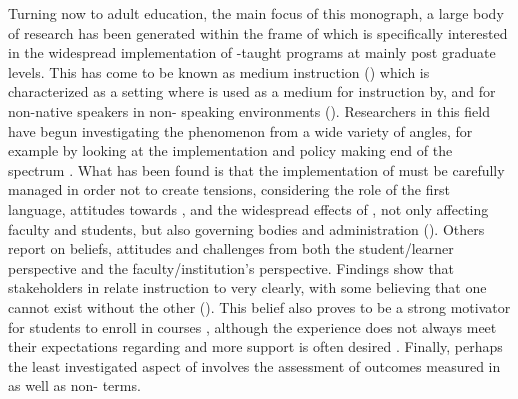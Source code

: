 \documentclass[output=paper]{langsci/langscibook}
\begin{document}
Turning now to adult education, the main focus of this monograph, a large body of research has been generated within the frame of  which is specifically interested in the widespread implementation of -taught programs at mainly post graduate levels. This has come to be known as  medium instruction () which is characterized as a setting where  is used as a medium for instruction by, and for non-native  speakers in non- speaking environments (\citealt{HellekjaerHellekjaer2015}). Researchers in this field have begun investigating the phenomenon from a wide variety of angles, for example by looking at the implementation and policy making end of the spectrum \citep{Tudor2007}. What has been found is that the implementation of  must be carefully managed in order not to create tensions, considering the role of the first language, attitudes towards , and the widespread effects of , not only affecting faculty and students, but also governing bodies and administration (\citealt{DoizEtAl2014policy}). Others report on beliefs, attitudes and challenges from both the student/learner perspective and the faculty/institution’s perspective. Findings show that stakeholders in  relate  instruction to  very clearly, with some believing that one cannot exist without the other (\citealt{HenryGoddard2015}). This belief also proves to be a strong motivator for students to enroll in  courses \citep{MargićŽeželić2015}, although the experience does not always meet their expectations regarding  and more support is often desired \citep{Sert2008}. Finally, perhaps the least investigated aspect of  involves the assessment of outcomes measured in  as well as non- terms. 
\end{document}
